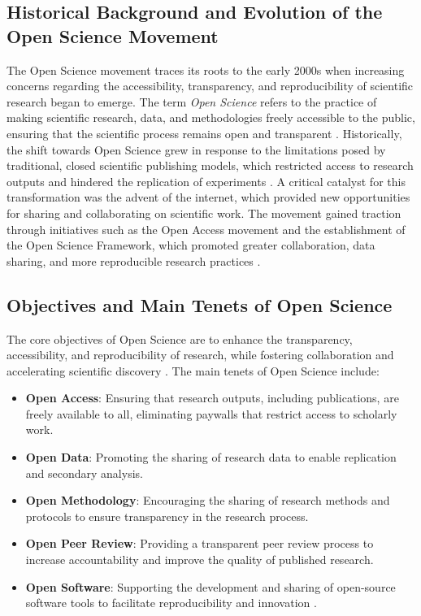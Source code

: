 \documentclass{article}
\begin{document}
\subsection{Historical Background and Evolution of the Open Science Movement}
The Open Science movement traces its roots to the early 2000s when increasing concerns regarding the accessibility, transparency, and reproducibility of scientific research began to emerge. The term \emph{Open Science} refers to the practice of making scientific research, data, and methodologies freely accessible to the public, ensuring that the scientific process remains open and transparent \cite{Boulton2015}. Historically, the shift towards Open Science grew in response to the limitations posed by traditional, closed scientific publishing models, which restricted access to research outputs and hindered the replication of experiments \cite{Borgman2012}. A critical catalyst for this transformation was the advent of the internet, which provided new opportunities for sharing and collaborating on scientific work. The movement gained traction through initiatives such as the Open Access movement and the establishment of the Open Science Framework, which promoted greater collaboration, data sharing, and more reproducible research practices \cite{Nosek2015}.

\subsection{Objectives and Main Tenets of Open Science}
The core objectives of Open Science are to enhance the transparency, accessibility, and reproducibility of research, while fostering collaboration and accelerating scientific discovery \cite{Leonelli2016}. The main tenets of Open Science include:
\begin{itemize}
    \item \textbf{Open Access}: Ensuring that research outputs, including publications, are freely available to all, eliminating paywalls that restrict access to scholarly work.
    \item \textbf{Open Data}: Promoting the sharing of research data to enable replication and secondary analysis.
    \item \textbf{Open Methodology}: Encouraging the sharing of research methods and protocols to ensure transparency in the research process.
    \item \textbf{Open Peer Review}: Providing a transparent peer review process to increase accountability and improve the quality of published research.
    \item \textbf{Open Software}: Supporting the development and sharing of open-source software tools to facilitate reproducibility and innovation \cite{Piwowar2011}.
\end{itemize}
\end{document}
